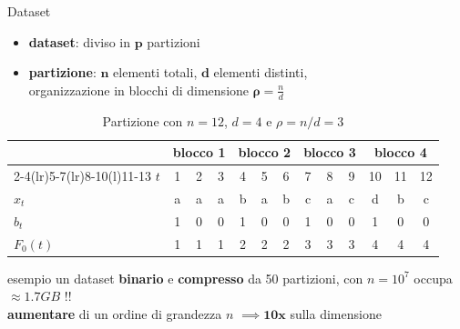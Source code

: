 \documentclass[aspectratio=169, 10pt]{beamer}
\begin{document}

  \begin{frame}{Dataset}
    \begin{itemize}
      \item \textbf{dataset}: diviso in $\mathbf{p}$ partizioni
      \item \textbf{partizione}: $\mathbf{n}$ elementi totali, $\mathbf{d}$ elementi distinti, \\
      organizzazione in blocchi di dimensione $\boldsymbol{\rho} = \frac{n}{d}$
    \end{itemize}
    
    \begin{table}
      \centering
      \scriptsize
      \begin{tabular}{@{}lcccccccccccc@{}}
        \toprule
        & \multicolumn{3}{c}{blocco 1}
        & \multicolumn{3}{c}{blocco 2}
        & \multicolumn{3}{c}{blocco 3}
        & \multicolumn{3}{c}{blocco 4} \\
        \cmidrule(lr){2-4}\cmidrule(lr){5-7}\cmidrule(lr){8-10}\cmidrule(l){11-13}
        \(t\) & 1 & 2 & 3 & 4 & 5 & 6 & 7 & 8 & 9 & 10 & 11 & 12 \\
        \midrule
        \(x_t\) & a & a & \multicolumn{1}{c|}{a} & b & a & \multicolumn{1}{c|}{b} & c & a & \multicolumn{1}{c|}{c} & d & b & c \\
        \(b_t\) & 1 & 0 & \multicolumn{1}{c|}{0} & 1 & 0 & \multicolumn{1}{c|}{0} & 1 & 0 & \multicolumn{1}{c|}{0} & 1 & 0 & 0 \\
        \(F_0(t)\) & 1 & 1 & \multicolumn{1}{c|}{1} & 2 & 2 & \multicolumn{1}{c|}{2} & 3 & 3 & \multicolumn{1}{c|}{3} & 4 & 4 & 4 \\
        \bottomrule
      \end{tabular}
      \caption{Partizione con \(n=12\), \(d=4\) e \(\rho=n/d=3\)}
    \end{table}

    \begin{alertblock}{esempio}
      un dataset \textbf{binario} e \textbf{compresso} da 50 partizioni, con $n = 10^7$ occupa $\approx 1.7 GB$ !!\\
      \textbf{aumentare} di un ordine di grandezza $n$ $\implies \mathbf{10x}$ sulla dimensione
    \end{alertblock}
  \end{frame}
\end{document}
